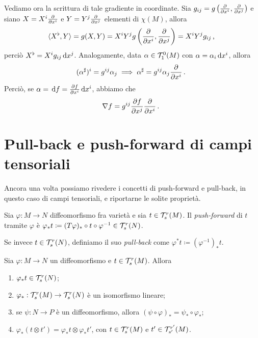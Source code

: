 Vediamo ora la scrittura di tale gradiente in coordinate. Sia $g_{ij} = g\left(\frac{\partial }{\partial x^i}, \frac{\partial }{\partial x^j}\right)$ e siano $X = X^i\frac{\partial }{\partial x^i}$ e $Y = Y^j\frac{\partial }{\partial x^j}$ elementi di $\chi(M)$, allora
\begin{equation*}
	\langle X^\flat , Y \rangle = g(X,Y) = X^iY^j g\left(\frac{\partial }{\partial x^i}, \frac{\partial }{\partial x^j}\right) = X^iY^j g_{ij} \, \text{, }
\end{equation*}
perciò $X^\flat = X^i g_{ij} \,\mathrm d x^j$.
Analogamente, data $\alpha \in \mathcal T_1^0(M)$ con $\alpha = \alpha_i\,\mathrm d x^i$, allora
\begin{equation*}
	(\alpha^\sharp)^i = g^{ij} \alpha_j \implies \alpha^\sharp = g^{ij} \alpha_j\frac{\partial }{\partial x^i} \, \text{. }
\end{equation*}
Perciò, se $\alpha = \,\mathrm d f = \frac{\partial f}{\partial x^i}\,\mathrm d x^i$, abbiamo che
\begin{equation*}
	\nabla f = g^{ij} \frac{\partial f}{\partial x^j} \frac{\partial }{\partial x^i} \, \text{. }
\end{equation*}



\section{Pull-back e push-forward di campi tensoriali}

Ancora una volta possiamo rivedere i concetti di push-forward e pull-back, in questo caso di campi tensoriali, e riportarne le solite proprietà.

\begin{definition}  
	Sia $\varphi : M \to N$ diffeomorfismo fra varietà e sia $t \in \mathcal T_s^r(M)$. Il \emph{push-forward} di $t$ tramite $\varphi$ è $\varphi_*t \coloneqq (T\varphi)_* \circ t \circ \varphi^{-1} \in \mathcal T_s^r(N)$.
	
	Se invece $t \in \mathcal T_s^r(N)$, definiamo il suo \emph{pull-back} come $\varphi^*t \coloneqq (\varphi^{-1})_* t$.
\end{definition}

\begin{proposition}
	Sia $\varphi: M \to N$ un diffeomorfismo e $t\in \mathcal T_s^r(M)$. Allora
	\begin{enumerate}
		\item $\varphi_*t \in \mathcal T_s^r(N)$;
		\item $\varphi_* : \mathcal T_s^r(M) \to \mathcal T_s^r(N)$ è un isomorfismo lineare;
		\item se $\psi: N \to P$ è un diffeomorfismo, allora $(\psi\circ \varphi)_* = \psi_* \circ \varphi_*$;
		\item $\varphi_*(t\otimes t') = \varphi_* t\otimes \varphi_* t'$, con $t\in \mathcal T_s^r(M)$ e $t'\in \mathcal T_{s'}^{r'}(M)$.
	\end{enumerate}
\end{proposition}

